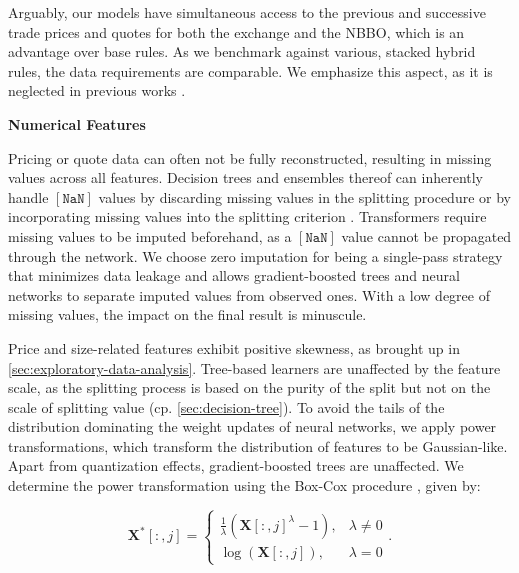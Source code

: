Arguably, our models have simultaneous access to the previous and successive trade prices and quotes for both the exchange and the NBBO, which is an advantage over base rules. As we benchmark against various, stacked hybrid rules, the data requirements are comparable. We emphasize this aspect, as it is neglected in previous works \autocites[][485]{blazejewskiLocalNonParametricModel2005}[][48]{ronenMachineLearningTrade2022}[][9]{rosenthalModelingTradeDirection2012}.

\textbf{Numerical Features}

Pricing or quote data can often not be fully reconstructed, resulting in missing values across all features. Decision trees and ensembles thereof can inherently handle $\mathtt{[NaN]}$ values by discarding missing values in the splitting procedure \autocite[][150--152]{breimanClassificationRegressionTrees2017} or by incorporating missing values into the splitting criterion \autocite[][951]{twalaGoodMethodsCoping2008}. Transformers require missing values to be imputed beforehand, as a $\mathtt{[NaN]}$ value cannot be propagated through the network. We choose zero imputation for being a single-pass strategy that minimizes data leakage and allows gradient-boosted trees and neural networks to separate imputed values from observed ones. With a low degree of missing values, the impact on the final result is minuscule.

Price and size-related features exhibit positive skewness, as brought up in \cref{sec:exploratory-data-analysis}. Tree-based learners are unaffected by the feature scale, as the splitting process is based on the purity of the split but not on the scale of splitting value (cp. \cref{sec:decision-tree}). To avoid the tails of the distribution dominating the weight updates of neural networks, we apply power transformations, which transform the distribution of features to be Gaussian-like. Apart from quantization effects, gradient-boosted trees are unaffected. We determine the power transformation using the Box-Cox procedure \autocite[][214]{boxAnalysisTransformations2022}, given by:

\begin{equation}
    \boldsymbol{X}^{*}\left[:,j\right]= \begin{cases}\frac{1}{\lambda}(\boldsymbol{X}\left[:,j\right]^\lambda-1), & \lambda \neq 0 \\ \log (\boldsymbol{X}\left[:,j\right]),& \lambda=0\end{cases}.
\label{eq:box-cox-test}
\end{equation}

